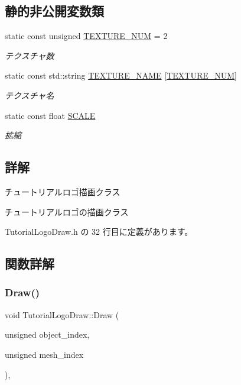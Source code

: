 \subsection*{静的非公開変数類}
\begin{DoxyCompactItemize}
\item 
static const unsigned \mbox{\hyperlink{class_tutorial_logo_draw_aff3396323c386d499aa23e5605085ab1}{T\+E\+X\+T\+U\+R\+E\+\_\+\+N\+UM}} = 2
\begin{DoxyCompactList}\small\item\em テクスチャ数 \end{DoxyCompactList}\item 
static const std\+::string \mbox{\hyperlink{class_tutorial_logo_draw_a294d374ad4876c63f561f282f5eb6200}{T\+E\+X\+T\+U\+R\+E\+\_\+\+N\+A\+ME}} \mbox{[}\mbox{\hyperlink{class_tutorial_logo_draw_aff3396323c386d499aa23e5605085ab1}{T\+E\+X\+T\+U\+R\+E\+\_\+\+N\+UM}}\mbox{]}
\begin{DoxyCompactList}\small\item\em テクスチャ名 \end{DoxyCompactList}\item 
static const float \mbox{\hyperlink{class_tutorial_logo_draw_adb1a43e53dcacfc06835d8a1cc85e324}{S\+C\+A\+LE}}
\begin{DoxyCompactList}\small\item\em 拡縮 \end{DoxyCompactList}\end{DoxyCompactItemize}


\subsection{詳解}
チュートリアルロゴ描画クラス 

チュートリアルロゴの描画クラス 

 Tutorial\+Logo\+Draw.\+h の 32 行目に定義があります。



\subsection{関数詳解}
\mbox{\label{class_tutorial_logo_draw_aa808cfb8bc59d58bbd698a195603429f}} 
\subsubsection{\texorpdfstring{Draw()}{Draw()}}
{\footnotesize\ttfamily void Tutorial\+Logo\+Draw\+::\+Draw (\begin{DoxyParamCaption}\item[{unsigned}]{object\+\_\+index,  }\item[{unsigned}]{mesh\+\_\+index }\end{DoxyParamCaption})\hspace{0.3cm}{\ttfamily [override]}, {\ttfamily [virtual]}}



